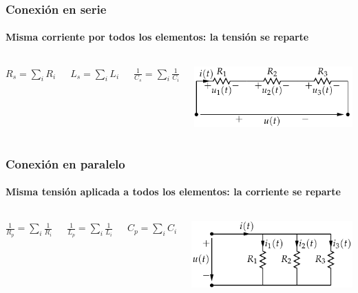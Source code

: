 \documentclass[serif, xcolor=dvipsnames]{beamer}
\begin{document}
\begin{frame}
  \frametitle{Conexión en serie }


  \framesubtitle{Misma corriente por todos los elementos: la tensión
    se reparte}
  \begin{columns}[c]%


    \column{3cm}


    $R_{s}=\sum_{i}R_{i}$


    $L_{s}=\sum_{i}L_{i}$


    $\frac{1}{C_{s}}=\sum_{i}\frac{1}{C_{i}}$


    \column{5cm}


    \begin{center}
      \includegraphics{../figs/AsociacionSerie}
      \par\end{center}

  \end{columns}%

\end{frame}
\begin{frame}
  \frametitle{Conexión en paralelo}


  \framesubtitle{Misma tensión aplicada a todos los elementos: la
    corriente se reparte}
  \begin{columns}[c]%


    \column{3cm}


    $\frac{1}{R_{p}}=\sum_{i}\frac{1}{R_{i}}$


    $\frac{1}{L_{p}}=\sum_{i}\frac{1}{L_{i}}$


    $C_{p}=\sum_{i}C_{i}$


    \column{5cm}


    \begin{center}
      \includegraphics{../figs/AsociacionParalelo}
      \par\end{center}

  \end{columns}%

\end{frame}
\end{document}
